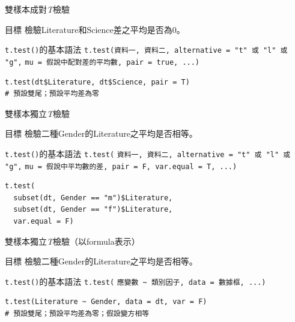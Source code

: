 \documentclass[12pt, aspectratio=43]{beamer}
\begin{document}
\begin{frame}[fragile]{雙樣本成對\emph{T}檢驗}
\begin{block}{目標}
檢驗Literature和Science差之平均是否為0。
\end{block}
\begin{block}{\texttt{t.test()}的基本語法}
\verb+t.test(資料一, 資料二, alternative = "t" 或 "l" 或 "g",+
\verb+mu = 假說中配對差的平均數, pair = true, ...)+
\end{block}
\begin{verbatim}
t.test(dt$Literature, dt$Science, pair = T)
# 預設雙尾；預設平均差為零
\end{verbatim}
\end{frame}


\begin{frame}[fragile]{雙樣本獨立\emph{T}檢驗}
\begin{block}{目標}
檢驗二種Gender的Literature之平均是否相等。
\end{block}
\begin{block}{\texttt{t.test()}的基本語法}
\verb+t.test(+
\verb+資料一, 資料二, alternative = "t" 或 "l" 或 "g",+
\verb+mu = 假說中平均數的差, pair = F, var.equal = T, ...)+
\end{block}
\begin{verbatim}
t.test(
  subset(dt, Gender == "m")$Literature,
  subset(dt, Gender == "f")$Literature,
  var.equal = F)
\end{verbatim}
\end{frame}

\begin{frame}[fragile]{雙樣本獨立\emph{T}檢驗（以formula表示）}
\begin{block}{目標}
檢驗二種Gender的Literature之平均是否相等。
\end{block}
\begin{block}{\texttt{t.test()}的基本語法}
\verb+t.test(+
\verb+應變數 ~ 類別因子, data = 數據框, ...)+
\end{block}
\begin{verbatim}
t.test(Literature ~ Gender, data = dt, var = F)
# 預設雙尾；預設平均差為零；假設變方相等
\end{verbatim}
\end{frame}
\end{document}

